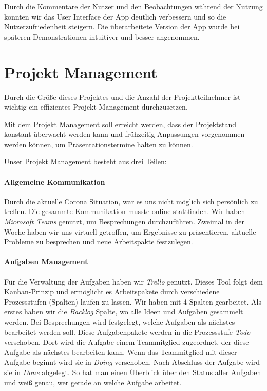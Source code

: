 \documentclass[titlepage, a4paper, 11pt]{scrartcl}
\begin{document}
  Durch die Kommentare der Nutzer und den Beobachtungen während der Nutzung konnten wir das User Interface der App deutlich verbessern und so die Nutzerzufriedenheit steigern. Die überarbeitete Version der App wurde bei späteren Demonstrationen intuitiver und besser angenommen.
  
  \section{Projekt Management}

  Durch die Größe dieses Projektes und die Anzahl der Projektteilnehmer ist wichtig ein effizientes Projekt Management durchzusetzen.

  Mit dem Projekt Management soll erreicht werden, dass der Projektstand konstant überwacht werden kann und frühzeitig Anpassungen vorgenommen werden können, um Präsentationstermine halten zu können.

  Unser Projekt Management besteht aus drei Teilen:

  \paragraph{Allgemeine Kommunikation}
  Durch die aktuelle Corona Situation, war es uns nicht möglich sich persönlich zu treffen.
  Die gesammte Kommunikation musste online stattfinden.
  Wir haben \textit{Microsoft Teams} genutzt, um Besprechungen durchzuführen.
  Zweimal in der Woche haben wir uns virtuell getroffen, um Ergebnisse zu präsentieren, aktuelle Probleme zu besprechen und neue Arbeitspakte festzulegen.

  \paragraph{Aufgaben Management}
  Für die Verwaltung der Aufgaben haben wir \textit{Trello} genutzt.
  Dieses Tool folgt dem Kanban-Prinzip und ermöglicht es Arbeitspakete durch verschiedene Prozessstufen (Spalten) laufen zu lassen.
  Wir haben mit 4 Spalten gearbeitet. Als erstes haben wir die \textit{Backlog} Spalte, wo alle Ideen und Aufgaben gesammelt werden.
  Bei Besprechungen wird festgelegt, welche Aufgaben als nächstes bearbeitet werden soll. Diese Aufgabenpakete werden in die Prozessstufe \textit{Todo} verschoben.
  Dort wird die Aufgabe einem Teammitglied zugeordnet, der diese Aufgabe als nächstes bearbeiten kann.
  Wenn das Teammitglied mit dieser Aufgabe beginnt wird sie in \textit{Doing} verschoben.
  Nach Abschluss der Aufgabe wird sie in \textit{Done} abgelegt.
  So hat man einen Überblick über den Status aller Aufgaben und weiß genau, wer gerade an welche Aufgabe arbeitet.
  
\end{document}
